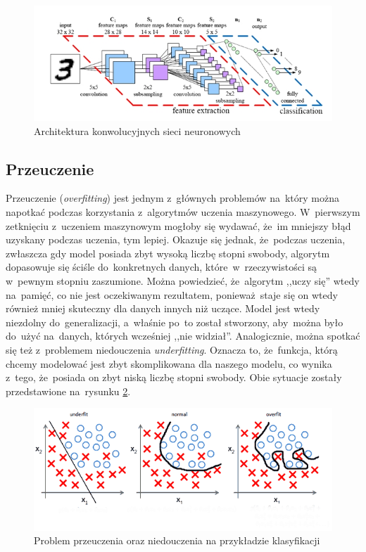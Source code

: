 \begin{figure}[ht!]
\centering
\includegraphics[scale=0.75]{res/cnn3.jpg}
\caption[Caption for LOF]{Architektura konwolucyjnych sieci neuronowych\footnotemark\label{cnn3}} 
\end{figure}

\subsection{Przeuczenie}
Przeuczenie (\textit{overfitting}) jest jednym z~głównych problemów na~który można napotkać podczas korzystania z~algorytmów uczenia maszynowego. W~pierwszym zetknięciu z~uczeniem maszynowym mogłoby się wydawać, że~im mniejszy błąd uzyskany podczas uczenia, tym lepiej. Okazuje się jednak, że~podczas uczenia, zwłaszcza gdy model posiada zbyt wysoką liczbę stopni swobody, algorytm dopasowuje się ściśle do~konkretnych danych, które~w~rzeczywistości są w~pewnym stopniu zaszumione. Można powiedzieć, że~algorytm ,,uczy się'' wtedy na~pamięć, co nie jest oczekiwanym rezultatem, ponieważ~staje się on wtedy również mniej skuteczny dla danych innych niż uczące. Model jest wtedy niezdolny do~generalizacji, a~właśnie po~to został stworzony, aby~można było do~użyć na~danych, których wcześniej ,,nie widział''. Analogicznie, można spotkać się też z~problemem niedouczenia \textit{underfitting}. Oznacza to, że~funkcja, którą chcemy modelować jest zbyt skomplikowana dla naszego modelu, co wynika z~tego, że~posiada on zbyt niską liczbę stopni swobody. Obie sytuacje zostały przedstawione na~rysunku \ref{overfitting}.

\begin{figure}[ht!]
\centering
\includegraphics[scale=0.8]{res/overfitting.png}
\caption[Caption for LOF]{Problem przeuczenia oraz niedouczenia na przykładzie klasyfikacji\footnotemark \label{overfitting}} 
\end{figure}

